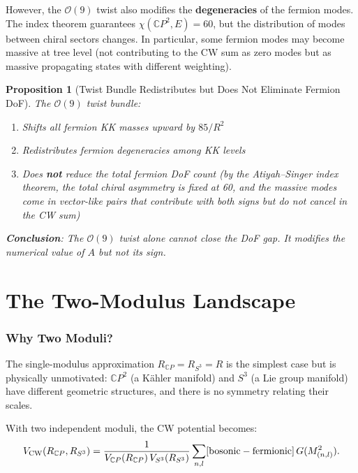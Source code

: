 \documentclass[11pt,a4paper]{article}
\newcommand{\CP}{\mathbb{C}P}
\newtheorem{proposition}{Proposition}
\begin{document}
However, the $\mathcal{O}(9)$ twist also modifies the
\textbf{degeneracies} of the fermion modes. The index theorem
guarantees $\chi(\CP^2, E) = 60$, but the distribution of modes
between chiral sectors changes. In particular, some fermion modes
may become massive at tree level (not contributing to the CW sum
as zero modes but as massive propagating states with different
weighting).

\begin{proposition}[Twist Bundle Redistributes but Does Not Eliminate Fermion DoF]
The $\mathcal{O}(9)$ twist bundle:
\begin{enumerate}[nosep]
\item Shifts all fermion KK masses upward by $85/R^2$
\item Redistributes fermion degeneracies among KK levels
\item Does \textbf{not} reduce the total fermion DoF count (by
  the Atiyah--Singer index theorem, the total chiral asymmetry is
  fixed at 60, and the massive modes come in vector-like pairs
  that contribute with both signs but do not cancel in the CW sum)
\end{enumerate}

\textbf{Conclusion}: The $\mathcal{O}(9)$ twist alone cannot close
the DoF gap. It modifies the numerical value of $A$ but not its sign.
\end{proposition}


\part{The Two-Modulus Landscape}
\label{part:two-modulus}

\section{Why Two Moduli?}
\label{sec:why-two}

The single-modulus approximation $R_{\CP} = R_{S^3} = R$ is the
simplest case but is physically unmotivated: $\CP^2$ (a K\"ahler
manifold) and $S^3$ (a Lie group manifold) have different geometric
structures, and there is no symmetry relating their scales.

With two independent moduli, the CW potential becomes:
\begin{equation}
V_{\rm CW}(R_{\CP}, R_{S^3}) = \frac{1}{V_{\CP}(R_{\CP})\,V_{S^3}(R_{S^3})}
\sum_{n,l} [\text{bosonic} - \text{fermionic}]\,G(M^2_{(n,l)}).
\end{equation}
\end{document}
